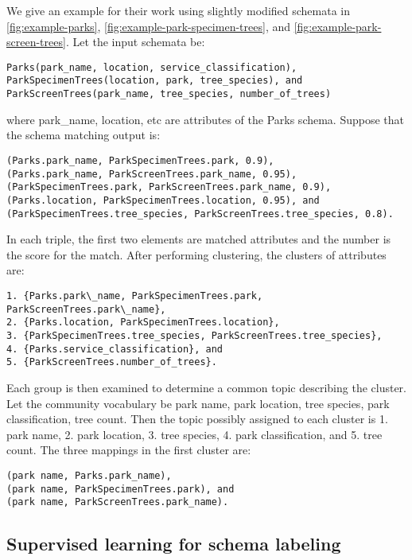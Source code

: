 We give an example for their work using slightly modified schemata in \autoref{fig:example-parks}, \autoref{fig:example-park-specimen-trees}, and \autoref{fig:example-park-screen-trees}. Let the input schemata be:

\begin{lstlisting}
Parks(park_name, location, service_classification),
ParkSpecimenTrees(location, park, tree_species), and
ParkScreenTrees(park_name, tree_species, number_of_trees)
\end{lstlisting}

where park\_name, location, etc are attributes of the Parks schema. Suppose that the schema matching output is:

\begin{lstlisting}
(Parks.park_name, ParkSpecimenTrees.park, 0.9),
(Parks.park_name, ParkScreenTrees.park_name, 0.95),
(ParkSpecimenTrees.park, ParkScreenTrees.park_name, 0.9),
(Parks.location, ParkSpecimenTrees.location, 0.95), and
(ParkSpecimenTrees.tree_species, ParkScreenTrees.tree_species, 0.8).
\end{lstlisting}

In each triple, the first two elements are matched attributes and the number is the score for the match. After performing clustering, the clusters of attributes are:
\begin{lstlisting}
1. {Parks.park\_name, ParkSpecimenTrees.park, ParkScreenTrees.park\_name},
2. {Parks.location, ParkSpecimenTrees.location},
3. {ParkSpecimenTrees.tree_species, ParkScreenTrees.tree_species},
4. {Parks.service_classification}, and
5. {ParkScreenTrees.number_of_trees}.
\end{lstlisting}

Each group is then examined to determine a common topic describing the cluster. Let the community vocabulary be {park name, park location, tree species, park classification, tree count}. Then the topic possibly assigned to each cluster is {1. park name, 2. park location, 3. tree species, 4. park classification, and 5. tree count}. The three mappings in the first cluster are:
\begin{lstlisting}
(park name, Parks.park_name),
(park name, ParkSpecimenTrees.park), and
(park name, ParkScreenTrees.park_name).
\end{lstlisting}

\subsection{Supervised learning for schema labeling}
\label{ssec:SupervisedLearningForSchemaLabeling}

